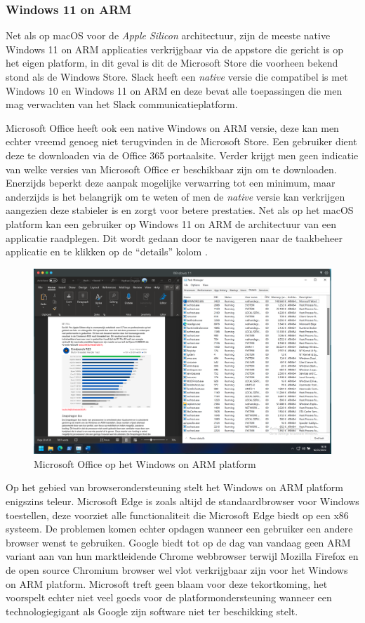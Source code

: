\subsubsection{Windows 11 on ARM}
Net als op macOS voor de \textit{Apple Silicon} architectuur, zijn de meeste native Windows 11 on ARM applicaties verkrijgbaar via de appstore die gericht is op het eigen platform, in dit geval is dit de Microsoft Store die voorheen bekend stond als de Windows Store. Slack heeft een \textit{native} versie die compatibel is met Windows 10 en Windows 11 on ARM en deze bevat alle toepassingen die men mag verwachten van het Slack communicatieplatform.

Microsoft Office heeft ook een native Windows on ARM versie, deze kan men echter vreemd genoeg niet terugvinden in de Microsoft Store. Een gebruiker dient deze te downloaden via de Office 365 portaalsite. Verder krijgt men geen indicatie van welke versies van Microsoft Office er beschikbaar zijn om te downloaden. Enerzijds beperkt deze aanpak mogelijke verwarring tot een minimum, maar anderzijds is het belangrijk om te weten of men de \textit{native} versie kan verkrijgen aangezien deze stabieler is en zorgt voor betere prestaties. Net als op het macOS platform kan een gebruiker op Windows 11 on ARM de architectuur van een applicatie raadplegen. Dit wordt gedaan door te navigeren naar de taakbeheer applicatie en te klikken op de “details” kolom \autocite{Venkat2020}.

\begin{figure}[!h]
	\centering
	\includegraphics[width=\linewidth]{img/office_winARM.png}
	\caption{Microsoft Office op het Windows on ARM platform}
\end{figure}

Op het gebied van browserondersteuning stelt het Windows on ARM platform enigszins teleur. Microsoft Edge is zoals altijd de standaardbrowser voor Windows toestellen, deze voorziet alle functionaliteit die Microsoft Edge biedt op een x86 systeem. De problemen komen echter opdagen wanneer een gebruiker een andere browser wenst te gebruiken. Google biedt tot op de dag van vandaag geen ARM variant aan van hun marktleidende Chrome webbrowser terwijl Mozilla Firefox en de open source Chromium browser wel vlot verkrijgbaar zijn voor het Windows on ARM platform. Microsoft treft geen blaam voor deze tekortkoming, het voorspelt echter niet veel goeds voor de platformondersteuning wanneer een technologiegigant als Google zijn software niet ter beschikking stelt.


